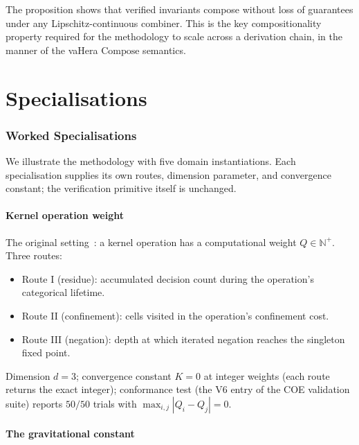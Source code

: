 \documentclass[twocolumn,11pt,a4paper]{article}
\newcommand{\Natural}{\mathbb{N}}
\newcommand{\Inv}{Q}
\newcommand{\Dim}{d}
\newcommand{\Tolb}{K}
\begin{document}
The proposition shows that verified invariants compose without loss of guarantees under any Lipschitz-continuous combiner. This is the key compositionality property required for the methodology to scale across a derivation chain, in the manner of the vaHera $\mathrm{Compose}$ semantics.

\part{Specialisations}

\section{Worked Specialisations}
\label{sec:specialisations}

We illustrate the methodology with five domain instantiations. Each specialisation supplies its own routes, dimension parameter, and convergence constant; the verification primitive itself is unchanged.

\subsection{Kernel operation weight}
\label{ssec:spec-coe}

The original setting~\citep{sachikonye2026coe}: a kernel operation has a computational weight $\Inv \in \Natural^+$. Three routes:
\begin{itemize}[nosep,leftmargin=*]
\item Route I (residue): accumulated decision count during the operation's categorical lifetime.
\item Route II (confinement): cells visited in the operation's confinement cost.
\item Route III (negation): depth at which iterated negation reaches the singleton fixed point.
\end{itemize}
Dimension $\Dim = 3$; convergence constant $\Tolb = 0$ at integer weights (each route returns the exact integer); conformance test (the V6 entry of the COE validation suite) reports $50/50$ trials with $\max_{i,j}|\Inv_i - \Inv_j| = 0$.

\subsection{The gravitational constant}
\label{ssec:spec-G}
\end{document}
